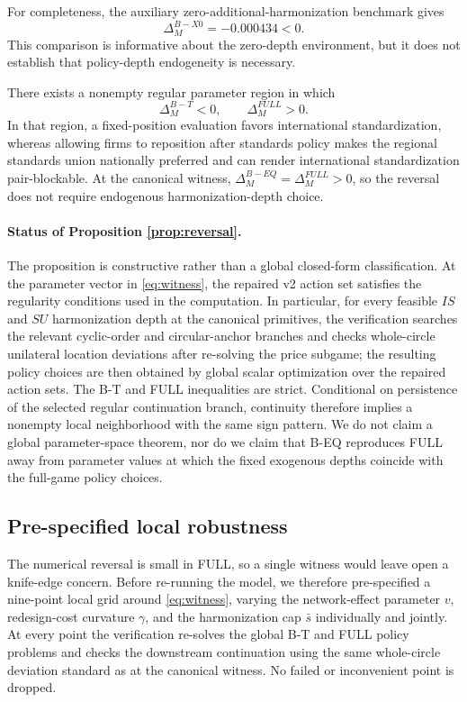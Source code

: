 For completeness, the auxiliary zero-additional-harmonization benchmark gives
\[
\Delta_M^{B-X0}=-0.000434<0.
\]
This comparison is informative about the zero-depth environment, but it does not establish that policy-depth endogeneity is necessary.

\begin{proposition}\label{prop:reversal}
There exists a nonempty regular parameter region in which
\[
\Delta_M^{B-T}<0,
\qquad
\Delta_M^{FULL}>0.
\]
In that region, a fixed-position evaluation favors international standardization, whereas allowing firms to reposition after standards policy makes the regional standards union nationally preferred and can render international standardization pair-blockable. At the canonical witness, $\Delta_M^{B-EQ}=\Delta_M^{FULL}>0$, so the reversal does not require endogenous harmonization-depth choice.
\end{proposition}

\paragraph{Status of Proposition \ref{prop:reversal}.}
The proposition is constructive rather than a global closed-form classification. At the parameter vector in \eqref{eq:witness}, the repaired v2 action set satisfies the regularity conditions used in the computation. In particular, for every feasible $IS$ and $SU$ harmonization depth at the canonical primitives, the verification searches the relevant cyclic-order and circular-anchor branches and checks whole-circle unilateral location deviations after re-solving the price subgame; the resulting policy choices are then obtained by global scalar optimization over the repaired action sets. The B-T and FULL inequalities are strict. Conditional on persistence of the selected regular continuation branch, continuity therefore implies a nonempty local neighborhood with the same sign pattern. We do not claim a global parameter-space theorem, nor do we claim that B-EQ reproduces FULL away from parameter values at which the fixed exogenous depths coincide with the full-game policy choices.

\subsection{Pre-specified local robustness}

The numerical reversal is small in FULL, so a single witness would leave open a knife-edge concern. Before re-running the model, we therefore pre-specified a nine-point local grid around \eqref{eq:witness}, varying the network-effect parameter $v$, redesign-cost curvature $\gamma$, and the harmonization cap $\bar s$ individually and jointly. At every point the verification re-solves the global B-T and FULL policy problems and checks the downstream continuation using the same whole-circle deviation standard as at the canonical witness. No failed or inconvenient point is dropped.

